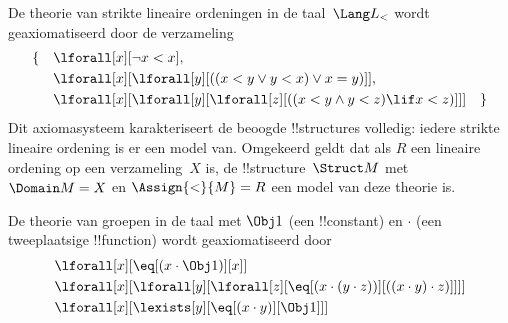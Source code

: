 \documentclass[openany]{memoir}
\begin{document}
\begingroup
\def\olfilename{OLP-0170}
\def\olfilepath{content/first-order-logic/models-theories/}
\hypertarget{unit-OLP-0170}{}





\begin{ex}
De theorie van strikte lineaire ordeningen in de taal~$\Lang L_<$
wordt geaxiomatiseerd door de verzameling
\begin{align*}
\{\quad & \lforall[x][\lnot x < x], \\
& \lforall[x][\lforall[y][((x < y \lor y <
    x) \lor x = y)]], \\
& \lforall[x][\lforall[y][\lforall[z][((x < y
      \land y < z) \lif x < z)]]] \quad \}
\end{align*}
Dit axiomasysteem karakteriseert de beoogde !!{structure}s volledig:
iedere strikte lineaire ordening is er een model van. Omgekeerd geldt
dat als $R$ een lineaire ordening op een verzameling~$X$ is, de
!!{structure}~$\Struct M$ met $\Domain M = X$ en
$\Assign{<}{M} = R$ een model van deze theorie is.
\end{ex}

\begin{ex}
De theorie van groepen in de taal met $\Obj 1$ (een !!{constant}) en
$\cdot$ (een tweeplaatsige !!{function}) wordt geaxiomatiseerd door
\begin{align*}
& \lforall[x][\eq[(x \cdot \Obj 1)][x]]\\
& \lforall[x][\lforall[y][\lforall[z][\eq[(x \cdot (y \cdot z))][((x
          \cdot y) \cdot z)]]]]\\
& \lforall[x][\lexists[y][\eq[(x \cdot y)][\Obj 1]]]
\end{align*}
\end{ex}
\end{document}

